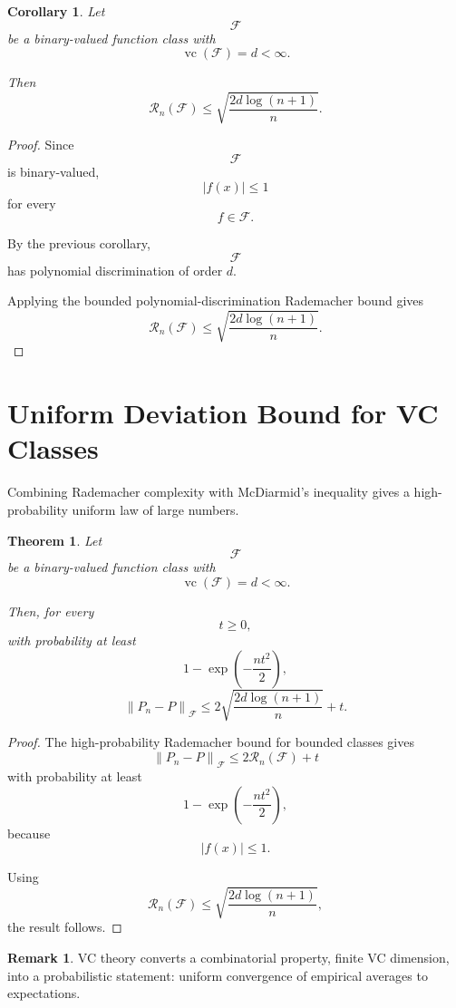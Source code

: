 \documentclass[12pt,oneside]{book}
\numberwithin{equation}{section}
\theoremstyle{definition}
\newtheorem{remark}{Remark}[section]
\theoremstyle{plain}
\newtheorem{theorem}{Theorem}[section]
\newtheorem{corollary}{Corollary}[section]
\theoremstyle{remark}
\newcommand{\norm}[1]{\left\lVert #1 \right\rVert}
\begin{document}
\begin{corollary}
Let
\[
\mathcal{F}
\]
be a binary-valued function class with
\[
\operatorname{vc}(\mathcal{F})=d<\infty.
\]

Then
\[
\mathcal{R}_n(\mathcal{F})
\leq
\sqrt{
\frac{2d\log(n+1)}{n}
}.
\]
\end{corollary}

\begin{proof}
Since
\[
\mathcal{F}
\]
is binary-valued,
\[
|f(x)|\leq1
\]
for every
\[
f\in\mathcal{F}.
\]

By the previous corollary,
\[
\mathcal{F}
\]
has polynomial discrimination of order $d$.

Applying the bounded polynomial-discrimination Rademacher bound gives
\[
\mathcal{R}_n(\mathcal{F})
\leq
\sqrt{
\frac{2d\log(n+1)}{n}
}.
\]
\end{proof}

\section{Uniform Deviation Bound for VC Classes}

Combining Rademacher complexity with McDiarmid's inequality gives a high-probability uniform law of large numbers.

\begin{theorem}
Let
\[
\mathcal{F}
\]
be a binary-valued function class with
\[
\operatorname{vc}(\mathcal{F})=d<\infty.
\]

Then, for every
\[
t\geq0,
\]
with probability at least
\[
1-\exp\left(-\frac{nt^2}{2}\right),
\]
\[
\norm{P_n-P}_{\mathcal{F}}
\leq
2\sqrt{
\frac{2d\log(n+1)}{n}
}
+
t.
\]
\end{theorem}

\begin{proof}
The high-probability Rademacher bound for bounded classes gives
\[
\norm{P_n-P}_{\mathcal{F}}
\leq
2\mathcal{R}_n(\mathcal{F})+t
\]
with probability at least
\[
1-\exp\left(-\frac{nt^2}{2}\right),
\]
because
\[
|f(x)|\leq1.
\]

Using
\[
\mathcal{R}_n(\mathcal{F})
\leq
\sqrt{
\frac{2d\log(n+1)}{n}
},
\]
the result follows.
\end{proof}

\begin{remark}
VC theory converts a combinatorial property, finite VC dimension, into a probabilistic statement: uniform convergence of empirical averages to expectations.
\end{remark}
\end{document}
